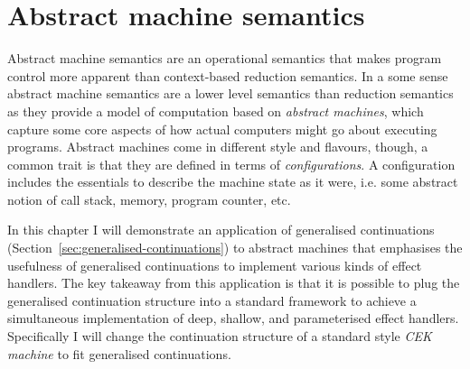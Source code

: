 \documentclass[12pt,phd,lfcs,twoside,openright,logo,leftchapter,normalheadings]{infthesis}
\theoremstyle{plain}
\theoremstyle{definition}
\begin{document}





\chapter{Abstract machine semantics}
\label{ch:abstract-machine}

Abstract machine semantics are an operational semantics that makes
program control more apparent than context-based reduction
semantics. In a some sense abstract machine semantics are a lower
level semantics than reduction semantics as they provide a model of
computation based on \emph{abstract machines}, which capture some core
aspects of how actual computers might go about executing programs.
%
Abstract machines come in different style and flavours, though, a
common trait is that they are defined in terms of
\emph{configurations}. A configuration includes the essentials to
describe the machine state as it were, i.e. some abstract notion of
call stack, memory, program counter, etc.

In this chapter I will demonstrate an application of generalised
continuations (Section~\ref{sec:generalised-continuations}) to
abstract machines that emphasises the usefulness of generalised
continuations to implement various kinds of effect handlers. The key
takeaway from this application is that it is possible to plug the
generalised continuation structure into a standard framework to
achieve a simultaneous implementation of deep, shallow, and
parameterised effect handlers.
%
Specifically I will change the continuation structure of a standard
\citeauthor{FelleisenF86} style \emph{CEK machine} to fit generalised
continuations.
\end{document}
